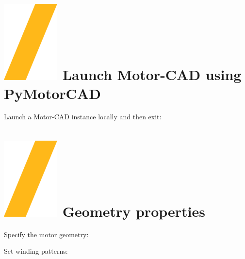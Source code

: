 \documentclass[landscape]{article}
\begin{document}
\begin{multicols}{3}
\setlength{\premulticols}{1pt}
\setlength{\postmulticols}{1pt}
\setlength{\multicolsep}{1pt}
\setlength{\columnsep}{2pt}

\section{\includegraphics[height=\fontcharht\font`\S]{slash.png} Launch Motor-CAD using PyMotorCAD}
Launch a Motor-CAD instance locally and then exit:



\section{\includegraphics[height=\fontcharht\font`\S]{slash.png} Geometry properties}
Specify the motor geometry:

Set winding patterns:


\end{multicols}
\end{document}
